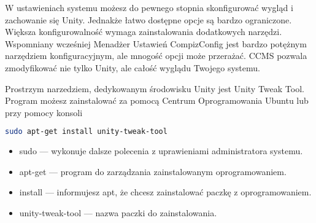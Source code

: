 W \textcolor{ubuntu_orange}{ustawieniach systemu} możesz do pewnego stopnia skonfigurować wygląd i zachowanie się Unity. Jednakże łatwo dostępne opcje są bardzo ograniczone. Większa konfigurowalność wymaga zainstalowania dodatkowych narzędzi. Wspomniany wcześniej Menadżer Ustawień CompizConfig jest bardzo potężnym narzędziem konfiguracyjnym, ale mnogość opcji może przerażać. CCMS pozwala zmodyfikować nie tylko Unity, ale całość wyglądu Twojego systemu.

Prostrzym narzedziem, dedykowanym środowisku Unity jest \textcolor{ubuntu_orange}{Unity Tweak Tool}. Program możesz zainstalować za pomocą Centrum Oprogramowania Ubuntu lub przy pomocy konsoli
\begin{lstlisting}[language=bash]
sudo apt-get install unity-tweak-tool
\end{lstlisting}
\begin{itemize}
\item \textcolor{ubuntu_orange}{sudo} --- wykonuje dalsze polecenia z uprawieniami administratora systemu.
\item \textcolor{ubuntu_orange}{apt-get} --- program do zarządzania zainstalowanym oprogramowaniem.
\item \textcolor{ubuntu_orange}{install} --- informujesz apt, że chcesz zainstalować paczkę z oprogramowaniem.
\item \textcolor{ubuntu_orange}{unity-tweak-tool} --- nazwa paczki do zainstalowania.
\end{itemize}